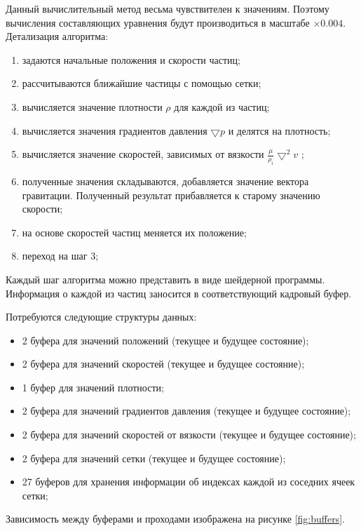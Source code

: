 Данный вычислительный метод весьма чувствителен к значениям. Поэтому вычисления составляющих
уравнения будут производиться в масштабе $\times0.004$. \\

Детализация алгоритма:

\begin{enumerate}
  \item задаются начальные положения и скорости частиц;
  \item рассчитываются ближайшие частицы с помощью сетки;
  \item вычисляется значение плотности $\rho$ для каждой из частиц;
  \item вычисляется значения градиентов давления $\bigtriangledown{}p$ и делятся на плотность;
  \item вычисляется значение скоростей, зависимых от вязкости $\frac{\mu}{\rho_i}\bigtriangledown^2v$ ;
  \item полученные значения складываются, добавляется значение вектора гравитации. Полученный
    результат прибавляется к старому значению скорости;
  \item на основе скоростей частиц меняется их положение;
  \item переход на шаг 3;
\end{enumerate}

Каждый шаг алгоритма можно представить в виде шейдерной программы. Информация о каждой из частиц 
заносится в соответствующий кадровый буфер. 

Потребуются следующие структуры данных:

\begin{itemize}
  \item 2 буфера для значений положений (текущее и будущее состояние);
  \item 2 буфера для значений скоростей (текущее и будущее состояние);
  \item 1 буфер для значений плотности;
  \item 2 буфера для значений градиентов давления (текущее и будущее состояние);
  \item 2 буфера для значений скоростей от вязкости (текущее и будущее состояние);
  \item 2 буфера для значений сетки (текущее и будущее состояние);
  \item 27 буферов для хранения информации об индексах каждой из соседних ячеек сетки;
\end{itemize}

Зависимость между буферами и проходами изображена на рисунке \ref{fig:buffers}.

